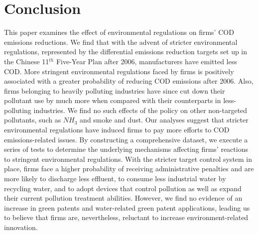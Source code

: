 \documentclass[12pt,english]{article}
\begin{document}


\section{Conclusion}  \label{sec:conclusion}

This paper examines the effect of environmental regulations on firms' COD emissions reductions. We find that with the advent of stricter environmental regulations, represented by the differential emissions reduction targets set up in the Chinese 11$^{th}$ Five-Year Plan after 2006, manufacturers have emitted less COD. More stringent environmental regulations faced by firms is positively associated with a greater probability of reducing COD emissions after 2006. Also, firms belonging to heavily polluting industries have since cut down their pollutant use by much more when compared with their counterparts in less-polluting industries. We find no such effects of the policy on other non-targeted pollutants, such as $NH_{3}$ and smoke and dust. Our analyses suggest that stricter environmental regulations have induced firms to pay more efforts to COD emissions-related issues. By constructing a comprehensive dataset, we execute a series of tests to determine the underlying mechanisms affecting firms' reactions to stringent environmental regulations. With the stricter target control system in place, firms face a higher probability of receiving administrative penalties and are more likely to discharge less effluent, to consume less industrial water by recycling water, and to adopt devices that control pollution as well as expand their current pollution treatment abilities. However, we find no evidence of an increase in green patents and water-related green patent applications, leading us to believe that firms are, nevertheless, reluctant to increase environment-related innovation.
\end{document}
